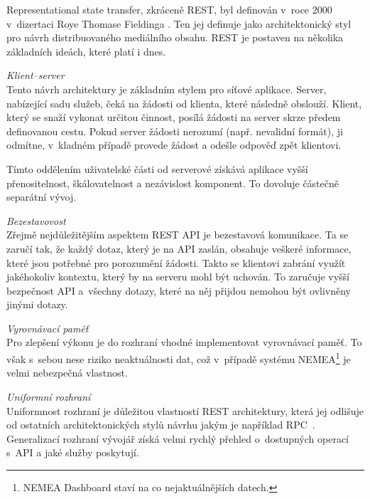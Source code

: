 Representational state transfer, zkráceně REST, byl definován v~roce 2000 v~dizertaci Roye Thomase Fieldinga \cite{rest}. Ten jej definuje jako architektonický styl pro návrh distribuovaného mediálního obsahu. REST je postaven na několika základních ideách, které platí i dnes.

\begin{description}
    \item \textit{Klient--server} \\
        Tento návrh architektury je základním stylem pro síťové aplikace. Server, nabízející sadu služeb, čeká na žádosti od klienta, které následně obslouží. Klient, který se snaží vykonat určitou činnost, posílá žádosti na server skrze předem definovanou cestu. Pokud server žádosti nerozumí (např. nevalidní formát), ji odmítne, v~kladném případě provede žádost a odešle odpověď zpět klientovi.

        Tímto oddělením uživatelské části od serverové získává aplikace vyšší přenositelnost, škálovatelnost a nezávislost komponent. To dovoluje částečně separátní vývoj.
       
    \item \textit{Bezestavovost} \\
        Zřejmě nejdůležitějším aspektem REST API je bezestavová komunikace. Ta se zaručí tak, že každý dotaz, který je na API zaslán, obsahuje veškeré informace, které jsou potřebné pro porozumění žádosti. Takto se klientovi zabrání využít jakéhokoliv kontextu, který by na serveru mohl být uchován. To zaručuje vyšší bezpečnost API a~všechny dotazy, které na něj přijdou nemohou být ovlivněny jinými dotazy.
       
    \item \textit{Vyrovnávací paměť} \\
        Pro zlepšení výkonu je do rozhraní vhodné implementovat vyrovnávací paměť. To však s~sebou nese riziko neaktuálnosti dat, což v~případě systému NEMEA\footnote{NEMEA Dashboard staví na co nejaktuálnějších datech.} je velmi nebezpečná vlastnost.
       
    \item \textit{Uniformní rozhraní} \\
        Uniformnost rozhraní je důležitou vlastností REST architektury, která jej odlišuje od ostatních architektonických stylů návrhu jakým je například RPC~\cite{restful}. Generalizací rozhraní vývojář získá velmi rychlý přehled o~dostupných operací s~API a jaké služby poskytují.
        

\end{description}
